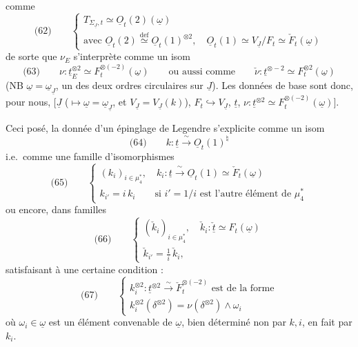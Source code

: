 \documentclass[11pt,a4paper]{article}
\begin{document}
comme
\[
  \text{(62)} \qquad
  \begin{cases}
    T_{\Sigma_{\underline{J}},t} \simeq \underline{O}_t(2)(\underline{\omega}) \\
    \text{avec } \underline{O}_t(2) \overset{\mathrm{def}}{\simeq} \underline{O}_t(1)^{\otimes 2},
    \quad \underline{O}_t(1) \simeq V_{\underline{J}}/F_t \simeq \check{F}_t(\underline{\omega})
  \end{cases}
\]
de sorte que $\nu_E$ s'interprète comme un isom
\[
  \text{(63)} \qquad \nu : \underline{t}_E^{\otimes 2} \simeq F_t^{\otimes(-2)}(\underline{\omega})
  \qquad \text{ou aussi comme} \qquad
  \check{\nu} : \underline{t}^{\otimes -2} \simeq F_t^{\otimes 2}(\underline{\omega})
\]
(NB $\underline{\omega} = \underline{\omega}_{\underline{J}}$, un des deux ordres
circulaires sur $\underline{J}$). Les données de base sont donc,
pour nous, $\bigl[\underline{J}$ ($\mapsto \underline{\omega} = \underline{\omega}_{\underline{J}}$,
\ill{} et $V_{\underline{J}} = V_{\underline{J}}(k)$),
$F_t \hookrightarrow V_{\underline{J}}$, $\underline{t}$,
$\nu : \underline{t}^{\otimes 2} \simeq F_t^{\otimes(-2)}(\underline{\omega})\bigr]$.

Ceci posé, la donnée d'un épinglage de Legendre s'explicite comme un isom
\[
  \text{(64)} \qquad k : \underline{t} \xrightarrow{\;\sim\;} \underline{O}_t(1)^{\natural}
\]
i.e.\ comme une famille d'isomorphismes
\[
  \text{(65)} \qquad
  \begin{cases}
    (k_i)_{i \in \mu_4^{*}}, \quad k_i : \underline{t} \xrightarrow{\;\sim\;} \underline{O}_t(1) \simeq \check{F}_t(\underline{\omega}) \\
    k_{i'} = i\, k_i \qquad \text{si } i' = 1/i \text{ est l'autre élément de } \mu_4^{*}
  \end{cases}
\]
ou encore, dans familles
\[
  \text{(66)} \qquad
  \begin{cases}
    (\check{k}_i)_{i \in \mu_4^{*}}, \quad \check{k}_i : \check{\underline{t}} \simeq F_t(\underline{\omega}) \\
    \check{k}_{i'} = \tfrac{1}{i}\, \check{k}_i ,
  \end{cases}
\]
satisfaisant à une certaine condition :
\[
  \text{(67)} \qquad
  \begin{cases}
    k_i^{\otimes 2} : \underline{t}^{\otimes 2} \xrightarrow{\;\sim\;} \check{F}_t^{\otimes(-2)} \text{ est de la forme} \\
    k_i^{\otimes 2}(\delta^{\otimes 2}) = \nu(\delta^{\otimes 2}) \wedge \omega_i
  \end{cases}
\]
où $\omega_i \in \underline{\omega}$ est un élément convenable de
$\underline{\omega}$, bien déterminé non par $k, i$, en fait par $k_i$.
\end{document}
